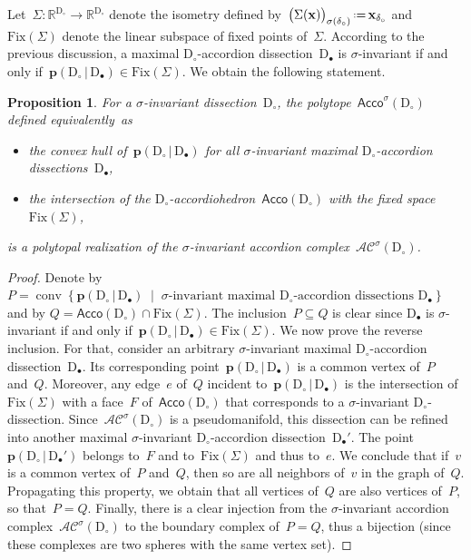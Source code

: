 \documentclass{amsart}
\newtheorem{proposition}[theorem]{Proposition}
\theoremstyle{definition}
\newcommand{\R}{\mathbb{R}} %
\renewcommand{\b}[1]{\mathbf{#1}} %
\newcommand{\set}[2]{\left\{ #1 \;\middle|\; #2 \right\}} %
\newcommand{\eqdef}{\mbox{\,\raisebox{0.2ex}{\scriptsize\ensuremath{\mathrm:}}\ensuremath{=}\,}} %
\newcommand{\Acco}{\mathsf{Acco}} %
\DeclareMathOperator{\conv}{conv} %
\newcommand{\accordionComplex}{\mathcal{AC}} %
\newcommand{\dissection}{\mathrm{D}} %
\newcommand{\point}[2]{\mathbf{p}(#1  \,|\, #2)} %
\newcommand{\fix}[1]{\mathrm{Fix}(#1)} %
\begin{document}
Let~$\Sigma : \R^{\dissection_\circ} \to \R^{\dissection_\circ}$ denote the isometry defined by~$\big( \Sigma(\b{x}) \big)_{\sigma(\delta_\circ)} \eqdef \b{x}_{\delta_\circ}$ and~$\fix{\Sigma}$ denote the linear subspace of fixed points of~$\Sigma$. According to the previous discussion, a maximal $\dissection_\circ$-accordion dissection~$\dissection_\bullet$ is $\sigma$-invariant if and only if~$\point{\dissection_\circ}{\dissection_\bullet} \in \fix{\Sigma}$. We obtain the following statement.

\begin{proposition}
For a $\sigma$-invariant dissection~$\dissection_\circ$, the polytope~$\Acco^\sigma(\dissection_\circ)$ defined equivalently~as
\begin{itemize}
\item the convex hull of~$\point{\dissection_\circ}{\dissection_\bullet}$ for all $\sigma$-invariant maximal $\dissection_\circ$-accordion dissections~$\dissection_\bullet$,
\item the intersection of the $\dissection_\circ$-accordiohedron~$\Acco(\dissection_\circ)$ with the fixed space~$\fix{\Sigma}$,
\end{itemize}
is a polytopal realization of the $\sigma$-invariant accordion complex~$\accordionComplex^\sigma(\dissection_\circ)$.
\end{proposition}

\begin{proof}
Denote by~$P = \conv \set{\point{\dissection_\circ}{\dissection_\bullet}}{\text{$\sigma$-invariant maximal $\dissection_\circ$-accordion dissections~$\dissection_\bullet$}}$ and by ${Q = \Acco(\dissection_\circ) \cap \fix{\Sigma}}$. The inclusion~$P \subseteq Q$ is clear since $\dissection_\bullet$ is $\sigma$-invariant if and only if~$\point{\dissection_\circ}{\dissection_\bullet} \in \fix{\Sigma}$. We now prove the reverse inclusion. For that, consider an arbitrary $\sigma$-invariant maximal $\dissection_\circ$-accordion dissection~$\dissection_\bullet$. Its corresponding point~$\point{\dissection_\circ}{\dissection_\bullet}$ is a common vertex of~$P$ and~$Q$. Moreover, any edge~$e$ of~$Q$ incident to~$\point{\dissection_\circ}{\dissection_\bullet}$ is the intersection of $\fix{\Sigma}$ with a face~$F$ of~$\Acco(\dissection_\circ)$ that corresponds to a $\sigma$-invariant $\dissection_\circ$-dissection. Since~$\accordionComplex^\sigma(\dissection_\circ)$ is a pseudomanifold, this dissection can be refined into another maximal $\sigma$-invariant $\dissection_\circ$-accordion dissection~$\dissection_\bullet'$. The point~$\point{\dissection_\circ}{\dissection_\bullet'}$ belongs to~$F$ and to~$\fix{\Sigma}$ and thus to~$e$. We conclude that if~$v$ is a common vertex of~$P$ and~$Q$, then so are all neighbors of~$v$ in the graph of~$Q$. Propagating this property, we obtain that all vertices of~$Q$ are also vertices of~$P$, so that~$P = Q$. Finally, there is a clear injection from the $\sigma$-invariant accordion complex~$\accordionComplex^\sigma(\dissection_\circ)$ to the boundary complex of~$P = Q$, thus a bijection (since these complexes are two spheres with the same vertex set).
\end{proof}
\end{document}
